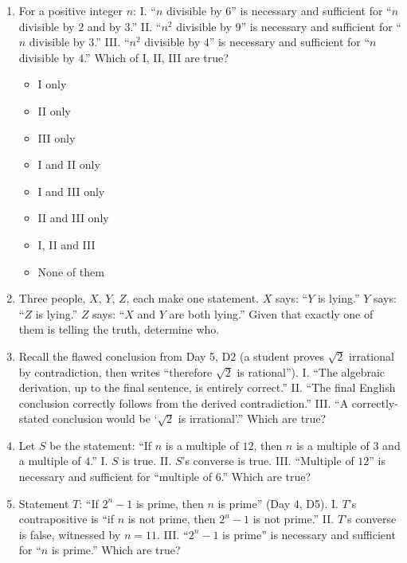 \documentclass[11pt,a4paper]{article}
\begin{document}
\begin{enumerate}

\item For a positive integer $n$: I. ``$n$ divisible by $6$'' is necessary and sufficient for ``$n$ divisible by $2$ and by $3$.'' II. ``$n^2$ divisible by $9$'' is necessary and sufficient for ``$n$ divisible by $3$.'' III. ``$n^2$ divisible by $4$'' is necessary and sufficient for ``$n$ divisible by $4$.'' Which of I, II, III are true?
\begin{itemize}
\item[A)] I only
\item[B)] II only
\item[C)] III only
\item[D)] I and II only
\item[E)] I and III only
\item[F)] II and III only
\item[G)] I, II and III
\item[H)] None of them
\end{itemize}

\item Three people, $X$, $Y$, $Z$, each make one statement. $X$ says: ``$Y$ is lying.'' $Y$ says: ``$Z$ is lying.'' $Z$ says: ``$X$ and $Y$ are both lying.'' Given that exactly one of them is telling the truth, determine who.

\item Recall the flawed conclusion from Day 5, D2 (a student proves $\sqrt2$ irrational by contradiction, then writes ``therefore $\sqrt2$ is rational''). I. ``The algebraic derivation, up to the final sentence, is entirely correct.'' II. ``The final English conclusion correctly follows from the derived contradiction.'' III. ``A correctly-stated conclusion would be `$\sqrt2$ is irrational'.'' Which are true?

\item Let $S$ be the statement: ``If $n$ is a multiple of $12$, then $n$ is a multiple of $3$ and a multiple of $4$.'' I. $S$ is true. II. $S$'s converse is true. III. ``Multiple of $12$'' is necessary and sufficient for ``multiple of $6$.'' Which are true?

\item Statement $T$: ``If $2^n-1$ is prime, then $n$ is prime'' (Day 4, D5). I. $T$'s contrapositive is ``if $n$ is not prime, then $2^n-1$ is not prime.'' II. $T$'s converse is false, witnessed by $n=11$. III. ``$2^n-1$ is prime'' is necessary and sufficient for ``$n$ is prime.'' Which are true?

\end{enumerate}

\end{document}
